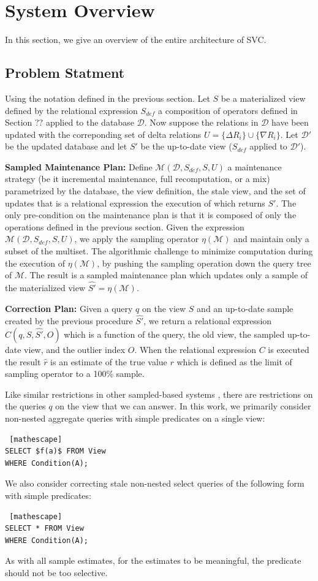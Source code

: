 \section{System Overview}\label{sec-arch}
In this section, we give an overview of the entire architecture of SVC.

\subsection{Problem Statment}
Using the notation defined in the previous section. 
Let $S$ be a materialized view defined by the relational expression $S_{def}$ a composition of operators defined in Section ?? applied to the database $\mathcal{D}$.
Now suppose the relations in $\mathcal{D}$ have been updated with the correponding set of delta relations $U = \{\Delta R_i\} \cup \{\nabla R_i\}$.
Let $\mathcal{D}'$ be the updated database and let $S'$ be the up-to-date view ($S_{def}$ applied to $\mathcal{D}'$).

\textbf{Sampled Maintenance Plan: }
Define $\mathcal{M}(\mathcal{D},S_{def},S,U)$ a maintenance strategy (be it incremental maintenance, full recomputation, or a mix) parametrized by the database, the view definition, the stale view, and the set of updates that is a relational expression the execution of which returns $S'$. The only pre-condition on the maintenance plan is that it is composed of only the operations defined in the previous section. Given the expression $\mathcal{M}(\mathcal{D},S_{def},S,U)$, we apply the sampling operator $\eta(\mathcal{M})$ and maintain only a subset of the multiset. The algorithmic challenge to minimize computation during the execution of $\eta(\mathcal{M})$, by pushing the sampling operation down the query tree of $\mathcal{M}$. The result is a sampled maintenance plan which updates only a sample of the materialized view $\hat{S'} = \eta(\mathcal{M})$.

\textbf{Correction Plan: }
Given a query $q$ on the view $S$ and an up-to-date sample created by the previous procedure $\hat{S'}$, we return a relational expression $C(q, S, \hat{S'}, O)$ which is a function of the query, the old view, the sampled up-to-date view, and the outlier index $O$. When the relational expression $C$ is executed the result $\hat{r}$ is an estimate of the true value $r$ which is defined as the limit of sampling operator to a 100\% sample.

Like similar restrictions in other sampled-based systems \cite{agarwalknowing}, there are restrictions on the queries $q$ on the view that we can answer. 
In this work, we primarily consider non-nested aggregate queries with simple predicates on a single view:
\begin{lstlisting} [mathescape]
SELECT $f(a)$ FROM View 
WHERE Condition(A);
\end{lstlisting}
We also consider correcting stale non-nested select queries of the following form with simple predicates:
\begin{lstlisting} [mathescape]
SELECT * FROM View 
WHERE Condition(A);
\end{lstlisting}
As with all sample estimates, for the estimates to be meaningful, the predicate should not be too selective.

